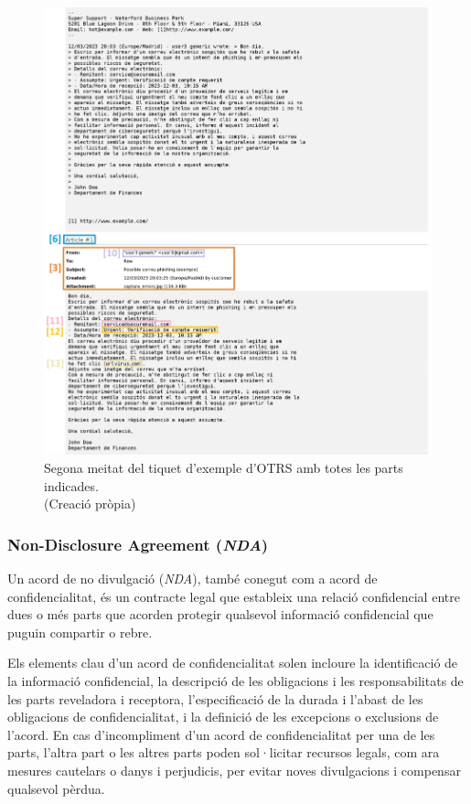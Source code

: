 \begin{figure}[H]
    \centering
    \includegraphics[width=\textwidth]{meitat-2.png}
    \caption[Segona meitat del tiquet d'exemple d'OTRS]{Segona meitat del tiquet d'exemple d'OTRS amb totes les parts indicades. \\ (Creació pròpia)}
    \label{fig:tiquet-exemple-2}
\end{figure}


\subsubsection{Non-Disclosure Agreement (\textit{NDA})}
Un acord de no divulgació (\textit{NDA}), també conegut com a acord de confidencialitat, és un contracte legal que estableix una relació confidencial entre dues o més parts que acorden protegir qualsevol informació confidencial que puguin compartir o rebre.

Els elements clau d'un acord de confidencialitat solen incloure la identificació de la informació confidencial, la descripció de les obligacions i les responsabilitats de les parts reveladora i receptora, l'especificació de la durada i l'abast de les obligacions de confidencialitat, i la definició de les excepcions o exclusions de l'acord. En cas d'incompliment d'un acord de confidencialitat per una de les parts, l'altra part o les altres parts poden sol·licitar recursos legals, com ara mesures cautelars o danys i perjudicis, per evitar noves divulgacions i compensar qualsevol pèrdua.

